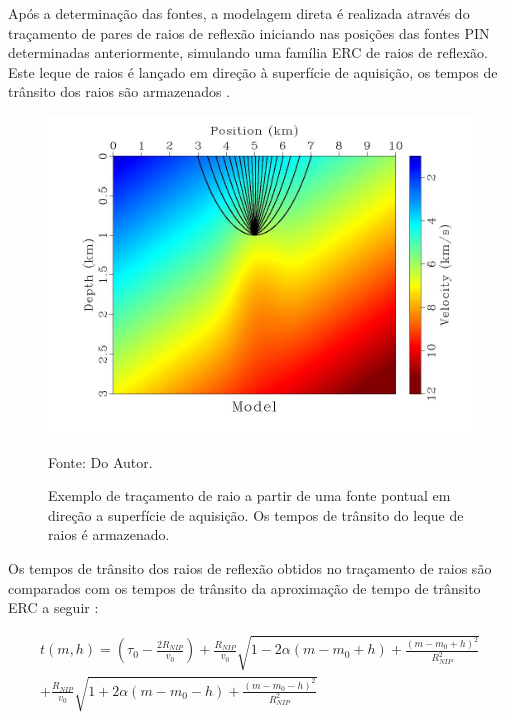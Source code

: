Após a determinação das fontes, a modelagem direta é realizada através do traçamento de pares de raios de reflexão
iniciando nas posições das fontes PIN determinadas anteriormente, simulando uma família ERC de raios de reflexão.
Este leque de raios é lançado em direção à superfície de aquisição,
os tempos de trânsito dos raios são armazenados \cite{stereo}.

\begin{figure}[H]
\caption{Exemplo de traçamento de raio a partir de uma fonte pontual em direção a superfície de aquisição.
Os tempos de trânsito do leque de raios é armazenado.}
\begin{center}
\includegraphics[scale=0.3]{images/raioleque.jpg}
\vspace{-0.3cm}
\end{center}
\begin{center}
 Fonte: Do Autor.
\end{center}
\label{fig:2.3}
\end{figure}

Os tempos de trânsito dos raios de reflexão obtidos no traçamento de raios são comparados com os tempos
de trânsito da aproximação de tempo de trânsito ERC a seguir \cite{cre,relatorio}:

\begin{multline}
\label{eq:2.1}
t(m,h)= \left( \tau_0-\frac{2R_{NIP}}{v_0} \right) 
+\frac{R_{NIP}}{v_0}\sqrt{1-2\alpha(m-m_0+h)+\frac{(m-m_0+h)^2}{R_{NIP}^2}} \\
+\frac{R_{NIP}}{v_0}\sqrt{1+2\alpha(m-m_0-h)+\frac{(m-m_0-h)^2}{R_{NIP}^2}}
\end{multline}

